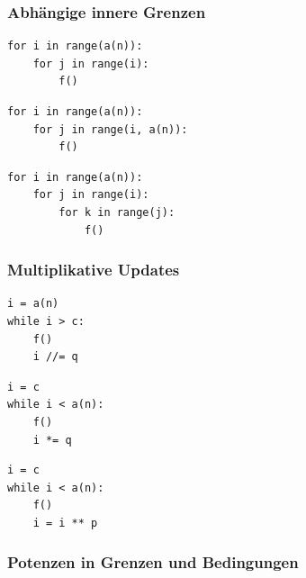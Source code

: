 \subsubsection{Abhängige innere Grenzen}

\begin{loopcatalog}
\begin{lstlisting}[style=CodeExpert]
for i in range(a(n)):
    for j in range(i):
        f()
\end{lstlisting}

\begin{lstlisting}[style=CodeExpert]
for i in range(a(n)):
    for j in range(i, a(n)):
        f()
\end{lstlisting}

\begin{lstlisting}[style=CodeExpert]
for i in range(a(n)):
    for j in range(i):
        for k in range(j):
            f()
\end{lstlisting}
\end{loopcatalog}

\subsubsection{Multiplikative Updates}

\begin{loopcatalog}
\begin{lstlisting}[style=CodeExpert]
i = a(n)
while i > c:
    f()
    i //= q
\end{lstlisting}

\begin{lstlisting}[style=CodeExpert]
i = c
while i < a(n):
    f()
    i *= q
\end{lstlisting}

\begin{lstlisting}[style=CodeExpert]
i = c
while i < a(n):
    f()
    i = i ** p
\end{lstlisting}
\end{loopcatalog}

\subsubsection{Potenzen in Grenzen und Bedingungen}

